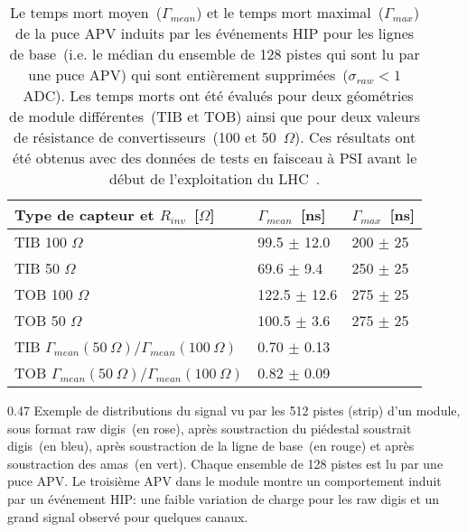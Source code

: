 \begin{table}[h]
\begin{center}
\begin{tabular}{|l|l|l|}
\hline
Type de capteur et $R_{inv}$~[$\Omega$] & $\Gamma_{mean}$~[ns]  & $\Gamma_{max}$~[ns] \\
\hline
\hline
TIB 100 $\Omega$ & 99.5 $\pm$ 12.0 & 200 $\pm$ 25 \\
TIB 50  $\Omega$ & 69.6 $\pm$ 9.4 & 250 $\pm$ 25 \\
TOB 100  $\Omega$ & 122.5 $\pm$ 12.6 & 275 $\pm$ 25 \\
TOB 50 $\Omega$  & 100.5 $\pm$ 3.6 & 275 $\pm$ 25 \\
\hline
TIB $\Gamma_{mean}(50~\Omega )/\Gamma_{mean}(100~\Omega)$ &  0.70 $\pm$ 0.13  & \\
TOB $\Gamma_{mean}(50~\Omega )/\Gamma_{mean}(100~\Omega)$ &  0.82 $\pm$ 0.09 & \\
\hline
\end{tabular}
\caption[Table caption text]{Le temps mort moyen~($\Gamma_{mean} $) et le temps mort maximal~($\Gamma_{max}$) de la puce APV induits par les événements HIP pour les lignes de base~(i.e. le médian du ensemble de 128 pistes qui sont lu par une puce APV) qui sont entièrement supprimées~($\sigma_{raw} <1 $~ADC). Les temps morts ont été évalués pour deux géométries de module différentes~(TIB et TOB) ainsi que pour deux valeurs de résistance de convertisseurs~(100 et 50~$\Omega$). Ces résultats ont été obtenus avec des données de tests en faisceau à PSI avant le début de l'exploitation du LHC~\cite{Bainbridge:2004jc}.}
\label{tab:tableDeadtimes2}
\end{center}
\end{table}


                 {0.47}
                 {Exemple de distributions du signal vu par les 512 pistes (strip) d'un module, sous format raw digis~(en rose), après soustraction du piédestal soustrait digis~(en bleu), après soustraction de la ligne de base~(en rouge) et après soustraction des amas~(en vert). Chaque ensemble de 128 pistes est lu par une puce APV. Le troisième APV dans le module montre un comportement induit par un événement HIP: une faible variation de charge pour les raw digis et un grand signal observé pour quelques canaux.}       %

